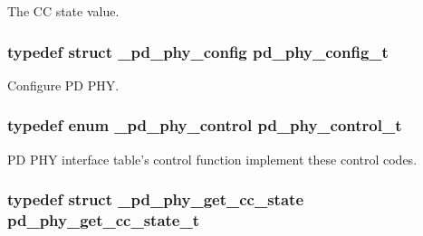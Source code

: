 The C\-C state value. 

\hypertarget{group__usb__pd__phy__drv_gab1d9a93a90c056727dcf364d6a5749e4}{
\subsubsection[{pd\-\_\-phy\-\_\-config\-\_\-t}]{\setlength{\rightskip}{0pt plus 5cm}typedef struct {\bf \-\_\-pd\-\_\-phy\-\_\-config}  {\bf pd\-\_\-phy\-\_\-config\-\_\-t}}}\label{group__usb__pd__phy__drv_gab1d9a93a90c056727dcf364d6a5749e4}


Configure P\-D P\-H\-Y. 

\hypertarget{group__usb__pd__phy__drv_ga5e3d7eb2cdbc2e45efca5e3e63d14baf}{
\subsubsection[{pd\-\_\-phy\-\_\-control\-\_\-t}]{\setlength{\rightskip}{0pt plus 5cm}typedef enum {\bf \-\_\-pd\-\_\-phy\-\_\-control}  {\bf pd\-\_\-phy\-\_\-control\-\_\-t}}}\label{group__usb__pd__phy__drv_ga5e3d7eb2cdbc2e45efca5e3e63d14baf}


P\-D P\-H\-Y interface table's control function implement these control codes. 

\hypertarget{group__usb__pd__phy__drv_gaad64c8a6c58f68d58feedd48b49778bd}{
\subsubsection[{pd\-\_\-phy\-\_\-get\-\_\-cc\-\_\-state\-\_\-t}]{\setlength{\rightskip}{0pt plus 5cm}typedef struct {\bf \-\_\-pd\-\_\-phy\-\_\-get\-\_\-cc\-\_\-state}  {\bf pd\-\_\-phy\-\_\-get\-\_\-cc\-\_\-state\-\_\-t}}}\label{group__usb__pd__phy__drv_gaad64c8a6c58f68d58feedd48b49778bd}


